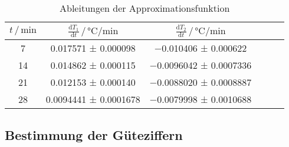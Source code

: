 \begin{table}
\centering
\caption{Ableitungen der Approximationsfunktion}
\label{tab:derivatives}
\begin{tabular}{c c c c c c}
\toprule
$t \,/\, \si{\minute}$ &
$\frac{\mathrm{d}T_1}{\mathrm{d}t} \,/\, \si{\celsius\per\minute}$ &
$\frac{\mathrm{d}T_2}{\mathrm{d}t} \,/\, \si{\celsius\per\minute}$ \\
\midrule
7  & \num{0.017571}  ± \num{0.000098}  & \num{-0.010406}  ± \num{0.000622} \\
14 & \num{0.014862}  ± \num{0.000115}  & \num{-0.0096042} ± \num{0.0007336} \\
21 & \num{0.012153}  ± \num{0.000140}  & \num{-0.0088020} ± \num{0.0008887} \\
28 & \num{0.0094441} ± \num{0.0001678} & \num{-0.0079998} ± \num{0.0010688} \\



\bottomrule
\end{tabular}
\end{table}


\subsection{Bestimmung der Güteziffern} %
\label{sec:auswertung_gueteziffern}

